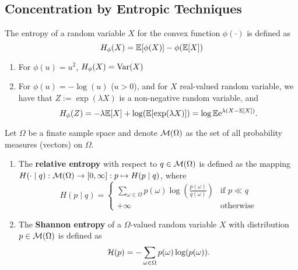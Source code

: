 \chapter{}

\section{Concentration by Entropic Techniques}

\begin{definition}[Entropy]
	The entropy of a random variable $X$ for the convex function $\phi(\cdot)$ is defined as
	\begin{equation}
		H_{\phi}(X)={\mathbb E}[\phi(X)]-\phi({\mathbb E}[X])
	\end{equation}
\end{definition}

\begin{example}
	\begin{enumerate}
		\item For $\phi(u)=u^2$, $H_{\phi}(X)=\mathrm{Var}(X)$
		\item For $\phi(u)=-\log(u)$ ($u>0$), and for $X$ real-valued random variable, we have that \(Z:=\exp(\lambda X)\) is a non-negative random variable, and
		      \begin{equation}
			      H_{\phi}(Z)=-\lambda{\mathbb E}[X]+\log({\mathbb E}[\exp(\lambda X)])=\log{\mathbb E}\mathrm{e}^{\lambda(X-{\mathbb E}[X])}.
		      \end{equation}
	\end{enumerate}
\end{example}

\begin{definition}
	Let $\Omega$ be a finate sample space and denote \({\mathcal M}(\Omega)\) as the set of all probability measures (vectors) on $\Omega$. \begin{enumerate}
		\item The \textbf{relative entropy} with respect to \(q\in{\mathcal M}(\Omega)\) is defined as the mapping \(H(\cdot\mid q):{\mathcal M}(\Omega)\to[0, \infty]:p\mapsto H(p\mid q)\), where
		      \begin{equation}
			      H(p\mid q)=\left\{
			      \begin{array}{ll}
				      \sum_{\omega\in\Omega}p(\omega)\log\left(\frac{p(\omega)}{q(\omega)}\right) & \text{if }p\ll q \\
				      +\infty                                                                     & \text{otherwise}
			      \end{array}
			      \right.
		      \end{equation}
		\item The \textbf{Shannon entropy} of a \(\Omega\)-valued random variable \(X\) with distribution \(p\in{\mathcal M}(\Omega)\) is defined as
		      \begin{equation}
			      {\mathcal H}(p)=-\sum_{\omega\in\Omega}p(\omega)\log(p(\omega)).
		      \end{equation}
	\end{enumerate}
\end{definition}


